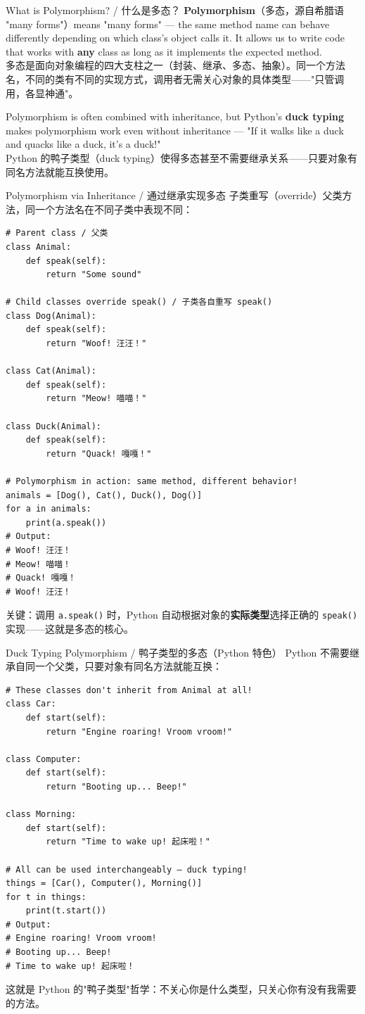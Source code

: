 \documentclass[11pt,a4paper]{report}
\let\oldtexttt\texttt
\renewcommand{\texttt}[1]{\textcolor{mainblue}{\oldtexttt{#1}}}
\begin{document}
\begin{concept}{What is Polymorphism? / 什么是多态？}
    \textbf{Polymorphism}（多态，源自希腊语 "many forms"）means "many forms" — the same method name can behave differently depending on which class's object calls it. It allows us to write code that works with \textbf{any} class as long as it implements the expected method. \\
    多态是面向对象编程的四大支柱之一（封装、继承、多态、抽象）。同一个方法名，不同的类有不同的实现方式，调用者无需关心对象的具体类型——"只管调用，各显神通"。

    Polymorphism is often combined with inheritance, but Python's \textbf{duck typing} makes polymorphism work even without inheritance — "If it walks like a duck and quacks like a duck, it's a duck!" \\
    Python 的鸭子类型（duck typing）使得多态甚至不需要继承关系——只要对象有同名方法就能互换使用。
\end{concept}

\begin{examplebox}{Polymorphism via Inheritance / 通过继承实现多态}
    子类重写（override）父类方法，同一个方法名在不同子类中表现不同：
\begin{lstlisting}
# Parent class / 父类
class Animal:
    def speak(self):
        return "Some sound"

# Child classes override speak() / 子类各自重写 speak()
class Dog(Animal):
    def speak(self):
        return "Woof! 汪汪！"

class Cat(Animal):
    def speak(self):
        return "Meow! 喵喵！"

class Duck(Animal):
    def speak(self):
        return "Quack! 嘎嘎！"

# Polymorphism in action: same method, different behavior!
animals = [Dog(), Cat(), Duck(), Dog()]
for a in animals:
    print(a.speak())
# Output:
# Woof! 汪汪！
# Meow! 喵喵！
# Quack! 嘎嘎！
# Woof! 汪汪！
\end{lstlisting}
    关键：调用 \texttt{a.speak()} 时，Python 自动根据对象的\textbf{实际类型}选择正确的 \texttt{speak()} 实现——这就是多态的核心。
\end{examplebox}

\begin{examplebox}{Duck Typing Polymorphism / 鸭子类型的多态（Python 特色）}
    Python 不需要继承自同一个父类，只要对象有同名方法就能互换：
\begin{lstlisting}
# These classes don't inherit from Animal at all!
class Car:
    def start(self):
        return "Engine roaring! Vroom vroom!"

class Computer:
    def start(self):
        return "Booting up... Beep!"

class Morning:
    def start(self):
        return "Time to wake up! 起床啦！"

# All can be used interchangeably — duck typing!
things = [Car(), Computer(), Morning()]
for t in things:
    print(t.start())
# Output:
# Engine roaring! Vroom vroom!
# Booting up... Beep!
# Time to wake up! 起床啦！
\end{lstlisting}
    这就是 Python 的"鸭子类型"哲学：不关心你是什么类型，只关心你有没有我需要的方法。
\end{examplebox}
\end{document}
